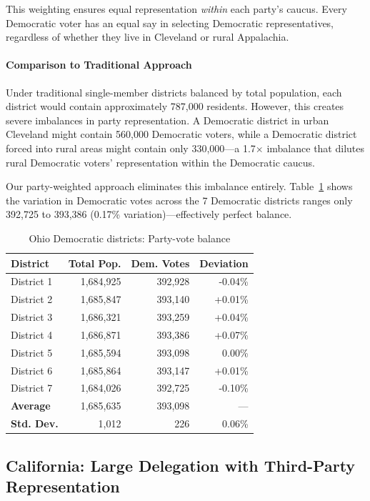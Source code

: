 This weighting ensures equal representation \emph{within} each party's caucus. Every Democratic voter has an equal say in selecting Democratic representatives, regardless of whether they live in Cleveland or rural Appalachia.

\paragraph{Comparison to Traditional Approach}
Under traditional single-member districts balanced by total population, each district would contain approximately 787,000 residents. However, this creates severe imbalances in party representation. A Democratic district in urban Cleveland might contain 560,000 Democratic voters, while a Democratic district forced into rural areas might contain only 330,000---a 1.7$\times$ imbalance that dilutes rural Democratic voters' representation within the Democratic caucus.

Our party-weighted approach eliminates this imbalance entirely. Table~\ref{tab:ohio-balance} shows the variation in Democratic votes across the 7 Democratic districts ranges only 392,725 to 393,386 (0.17\% variation)---effectively perfect balance.

\begin{table}[h]
\centering
\caption{Ohio Democratic districts: Party-vote balance}
\label{tab:ohio-balance}
\begin{tabular}{lrrr}
\toprule
District & Total Pop. & Dem. Votes & Deviation \\
\midrule
District 1 & 1,684,925 & 392,928 & -0.04\% \\
District 2 & 1,685,847 & 393,140 & +0.01\% \\
District 3 & 1,686,321 & 393,259 & +0.04\% \\
District 4 & 1,686,871 & 393,386 & +0.07\% \\
District 5 & 1,685,594 & 393,098 & 0.00\% \\
District 6 & 1,685,864 & 393,147 & +0.01\% \\
District 7 & 1,684,026 & 392,725 & -0.10\% \\
\midrule
\textbf{Average} & 1,685,635 & 393,098 & --- \\
\textbf{Std. Dev.} & 1,012 & 226 & 0.06\% \\
\bottomrule
\end{tabular}
\end{table}

\subsection{California: Large Delegation with Third-Party Representation}

